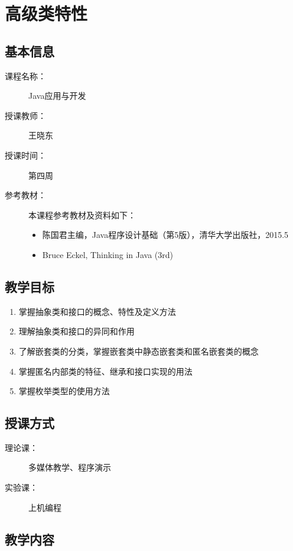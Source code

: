 \chapter{高级类特性}
\label{chp:Advanced-class-features}

\section*{基本信息}
\sline
\begin{description}
\item[课程名称：] Java应用与开发
\item[授课教师：] 王晓东
\item[授课时间：] 第四周
\item[参考教材：] 本课程参考教材及资料如下：
  \begin{itemize}
  \item 陈国君主编，Java程序设计基础（第5版），清华大学出版社，2015.5
  \item Bruce Eckel, Thinking in Java (3rd)
  \end{itemize}
\end{description}

\section*{教学目标}

\sline

\begin{enumerate}
\item 掌握抽象类和接口的概念、特性及定义方法
\item 理解抽象类和接口的异同和作用
\item 了解嵌套类的分类，掌握嵌套类中静态嵌套类和匿名嵌套类的概念
\item 掌握匿名内部类的特征、继承和接口实现的用法
\item 掌握枚举类型的使用方法
\end{enumerate}

\section*{授课方式}

\sline
\begin{description}
\item[理论课：] 多媒体教学、程序演示
\item[实验课：] 上机编程
\end{description}

\newpage
\section*{教学内容}
\sline


